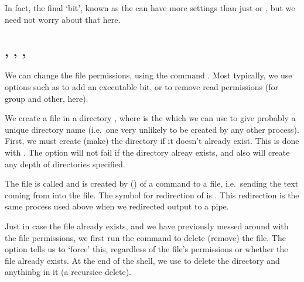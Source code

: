 \documentclass[letterpaper,10pt,english]{sphinxmanual}
\begin{document}
In fact, the final ‘bit’, known as the  can have more settings than just \sphinxcode{\sphinxupquote{\sphinxhyphen{}}} or , but we need not worry about that here.


\subsection{, \sphinxstyleliteralintitle{\sphinxupquote{\textgreater{}}}, , }
\label{\detokenize{Appendix1:chmod,->,-rm--f,-mkdir--p}}
We can change the file permissions, using the command . Most typically, we use options such as  to add an executable bit, or  to remove read permissions (for group and other, here).

We create a file in a directory , where \sphinxcode{\sphinxupquote{\$\$}} is the  which we can use to give probably a unique directory name (i.e. one very unlikely to be created by any other process). First, we must create (make) the directory if it doesn’t already exist. This is done with . The  option will not fail if the directory alreay exists, and also will create any depth of directories specified.

The file is called  and is created by  () of a command to a file, i.e. sending the text coming from  into the file. The symbol for redirection of  is \sphinxcode{\sphinxupquote{\textgreater{}}}. This redirection is the same process used above when we redirected output to a pipe.

Just in case the file already exists, and we have previously messed around with the file permissions, we first run the command  to delete (remove) the file. The  option tells us to ‘force’ this, regardless of the file’s permissions or whether the file already exists. At the end of the shell, we use  to delete the directory and anythinbg in it (a recursice delete).
\end{document}
